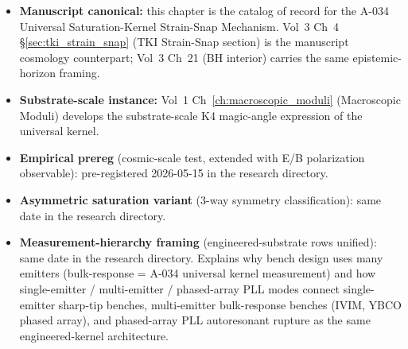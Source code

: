 \begin{itemize}
    \item \textbf{Manuscript canonical:} this chapter is the catalog of
    record for the A-034 Universal Saturation-Kernel Strain-Snap
    Mechanism. Vol~3 Ch~4 \S\ref{sec:tki_strain_snap} (TKI Strain-Snap
    section) is the manuscript cosmology counterpart; Vol~3 Ch~21
    (BH interior) carries the same epistemic-horizon framing.
    \item \textbf{Substrate-scale instance:} Vol~1 Ch~\ref{ch:macroscopic_moduli}
    (Macroscopic Moduli) develops the substrate-scale K4 magic-angle
    expression of the universal kernel.
    \item \textbf{Empirical prereg} (cosmic-scale test, extended with
    E/B polarization observable): pre-registered 2026-05-15 in the
    research directory.
    \item \textbf{Asymmetric saturation variant} (3-way symmetry
    classification): same date in the research directory.
    \item \textbf{Measurement-hierarchy framing} (engineered-substrate
    rows unified): same date in the research directory. Explains why
    bench design uses many emitters (bulk-response = A-034 universal kernel
    measurement) and how single-emitter / multi-emitter / phased-array
    PLL modes connect single-emitter sharp-tip benches, multi-emitter
    bulk-response benches (IVIM, YBCO phased array), and phased-array
    PLL autoresonant rupture as the same engineered-kernel architecture.
\end{itemize}
%
